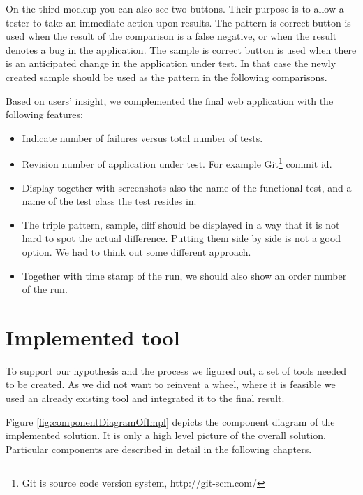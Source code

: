 \documentclass[11pt,oneside,final]{fithesis2}
\begin{document}
  On the third mockup you can also see two buttons. Their purpose is to allow a tester to take an immediate
  action upon results. The pattern is correct button is used when the result of the comparison is
  a false negative, or when the result denotes a bug in the application. The sample is correct button is used
  when there is an anticipated change in the application under test. 
  In that case the newly created sample should be used as the pattern in the following comparisons.
  
  Based on users' insight, we complemented the final web application with the following features:
  
  \begin{itemize}
   \item Indicate number of failures versus total number of tests.
   \item Revision number of application under test. For example Git\footnote{Git is source code version system, http://git-scm.com/}
   commit id.
   \item Display together with screenshots also the name of the functional test, and a name of the test class
   the test resides in.
   \item The triple pattern, sample, diff should be displayed in a way that it is not hard to spot the
   actual difference. Putting them side by side is not a good option. We had to think out some different
   approach.
   \item Together with time stamp of the run, we should also show an order number of the run.
  \end{itemize}

  
\chapter{Implemented tool}
To support our hypothesis and the process we figured out, a set of tools needed to be created. As we did
not want to reinvent a wheel, where it is feasible we used an already existing tool and integrated it to the
final result.

Figure \ref{fig:componentDiagramOfImpl} depicts the component diagram of the implemented solution. It is only a high
level picture of the overall solution. Particular components are described in detail in the following chapters.
\end{document}

